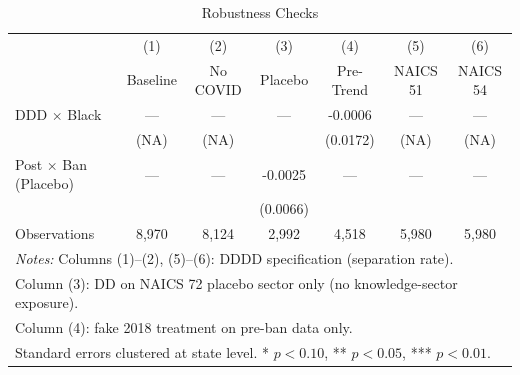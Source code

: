 \begin{table}[t]
\centering
\caption{Robustness Checks}
\label{tab:robust}
\small
\begin{tabular}{lcccccc}
\hline\hline
 & (1) & (2) & (3) & (4) & (5) & (6) \\
 & Baseline & No COVID & Placebo & Pre-Trend & NAICS 51 & NAICS 54 \\
\hline
DDD $\times$ Black & --- & --- & --- & -0.0006 & --- & --- \\
 & (NA) & (NA) & & (0.0172) & (NA) & (NA) \\
Post $\times$ Ban (Placebo) & --- & --- & -0.0025 & --- & --- & --- \\
 & & & (0.0066) & & & \\
\hline
Observations & 8,970 & 8,124 & 2,992 & 4,518 & 5,980 & 5,980 \\
\hline
\multicolumn{7}{l}{\footnotesize \textit{Notes:} Columns (1)--(2), (5)--(6): DDDD specification (separation rate).}\\
\multicolumn{7}{l}{\footnotesize Column (3): DD on NAICS 72 placebo sector only (no knowledge-sector exposure).}\\
\multicolumn{7}{l}{\footnotesize Column (4): fake 2018 treatment on pre-ban data only.}\\
\multicolumn{7}{l}{\footnotesize Standard errors clustered at state level. * $p<0.10$, ** $p<0.05$, *** $p<0.01$.}\\
\hline\hline
\end{tabular}
\end{table}
